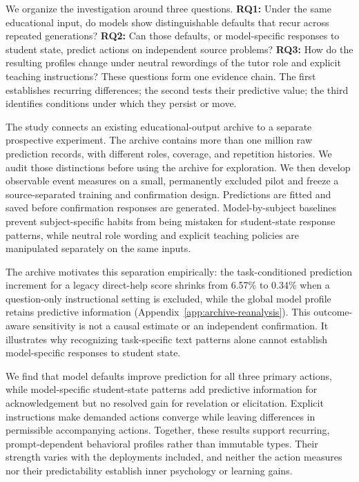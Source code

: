 We organize the investigation around three questions. \textbf{RQ1:} Under the
same educational input, do models show distinguishable defaults that recur
across repeated generations? \textbf{RQ2:} Can those defaults, or model-specific
responses to student state, predict actions on independent source problems?
\textbf{RQ3:} How do the resulting profiles change under neutral rewordings of
the tutor role and explicit teaching instructions? These questions form one
evidence chain. The first establishes recurring differences; the second tests
their predictive value; the third identifies conditions under which they persist
or move.

The study connects an existing educational-output archive to a separate
prospective experiment. The archive contains more than one million raw
prediction records, with different roles, coverage, and repetition histories.
We audit those distinctions before using the archive for exploration. We then
develop observable event measures on a small, permanently excluded pilot and
freeze a source-separated training and confirmation design. Predictions are
fitted and saved before confirmation responses are generated. Model-by-subject
baselines prevent subject-specific habits from being mistaken for student-state
response patterns, while neutral role wording and explicit teaching policies
are manipulated separately on the same inputs.

The archive motivates this separation empirically: the task-conditioned
prediction increment for a legacy direct-help score shrinks from 6.57\% to
0.34\% when a question-only instructional setting is excluded, while the
global model profile retains predictive information
(Appendix~\ref{app:archive-reanalysis}). This outcome-aware sensitivity is not a
causal estimate or an independent confirmation. It illustrates why recognizing
task-specific text patterns alone cannot establish model-specific responses to
student state.

We find that model defaults improve prediction for all three primary actions,
while model-specific student-state patterns add predictive information for
acknowledgement but no resolved gain for revelation or elicitation. Explicit
instructions make demanded actions converge while leaving differences in
permissible accompanying actions. Together, these results support recurring,
prompt-dependent behavioral profiles rather than immutable types. Their strength
varies with the deployments included, and neither the action measures nor their
predictability establish inner psychology or learning gains.
